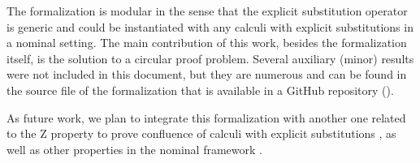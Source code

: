 The formalization is modular in the sense that the explicit substitution operator is generic and could be instantiated with any calculi with  explicit substitutions in a nominal setting. The main contribution of this work, besides the formalization itself, is the solution to a circular proof problem. Several auxiliary (minor) results were not included in this document, but they are numerous and can be found in the source file of the formalization that is available in a GitHub repository (\cite{msubstlemma}).


As future work, we plan to integrate this formalization with another one related to the Z property \cite{fmm2021} to prove confluence  of calculi with explicit substitutions \cite{nakazawaCompositionalConfluenceProofs2016,nakazawaCallbyvalue2017}, as well as  other properties in the nominal framework \cite{kesnerPerpetualityFullSafe2008}. 
\begin{coqdoccode}
\end{coqdoccode}
